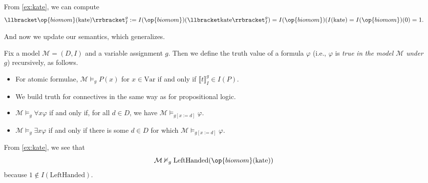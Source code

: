 \begin{example}
	From \autoref{ex:kate}, we can compute
	\[\llbracket\op{biomom}(\mathrm{kate})\rrbracket_I^g:=I(\op{biomom})(\llbracket \mathrm{kate}\rrbracket_I^g)=I(\op{biomom})(I(\mathrm{kate})=I(\op{biomom})(0)=1.\]
\end{example}
And now we update our semantics, which generalizes.
\begin{defihelper}[Truth]
	Fix a model $\mathcal M=(D,I)$ and a variable assignment $g$. Then we define the truth value of a formula $\varphi$ (i.e., $\varphi$ is \textit{true in the model $\mathcal M$ under $g$}) recursively, as follows.
	\begin{itemize}
		\item For atomic formulae, $\mathcal M\models_gP(x)$ for $x\in\mathrm{Var}$ if and only if $\llbracket t\rrbracket_I^g\in I(P)$.
		\item We build truth for connectives in the same way as for propositional logic.
		\item $\mathcal M\models_g\forall x\varphi$ if and only if, for all $d\in D$, we have $\mathcal M\models_{g[x:=d]}\varphi$.
		\item $\mathcal M\models_g\exists x\varphi$ if and only if there is some $d\in D$ for which $\mathcal M\models_{g[x:=d]}\varphi$.
	\end{itemize}
\end{defihelper}
\begin{example}
	From \autoref{ex:kate}, we see that
	\[\mathcal M\nvDash_g\mathrm{LeftHanded}(\op{biomom}(\mathrm{kate}))\]
	because $1\notin I(\mathrm{LeftHanded})$.
\end{example}